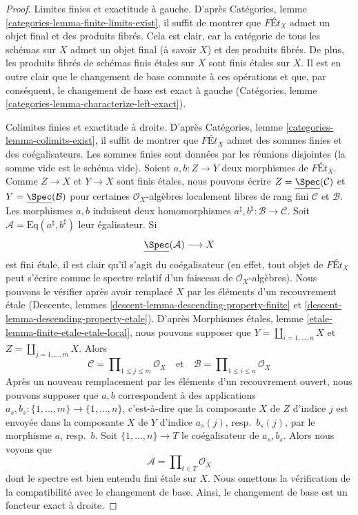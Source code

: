 \begin{proof}
Limites finies et exactitude à gauche. D'après
Catégories, lemme \ref{categories-lemma-finite-limits-exist},
il suffit de montrer que $\textit{F\'Et}_X$ admet un objet final
et des produits fibrés. Cela est clair, car la catégorie de
tous les schémas sur $X$ admet un objet final (à savoir $X$) et des produits fibrés.
De plus, les produits fibrés de schémas finis \'etales sur $X$ sont
finis \'etales sur $X$. Il est en outre clair que le changement
de base commute à ces opérations et que, par conséquent, le changement de base
est exact à gauche (Catégories, lemme
\ref{categories-lemma-characterize-left-exact}).

\medskip\noindent
Colimites finies et exactitude à droite. D'après
Catégories, lemme \ref{categories-lemma-colimits-exist},
il suffit de montrer que $\textit{F\'Et}_X$ admet des sommes
finies et des coégalisateurs. Les sommes finies sont données
par les réunions disjointes (la somme vide est le schéma vide).
Soient $a, b : Z \to Y$ deux morphismes de $\textit{F\'Et}_X$.
Comme $Z \to X$ et $Y \to X$ sont finis \'etales, nous pouvons écrire
$Z = \underline{\Spec}(\mathcal{C})$ et $Y = \underline{\Spec}(\mathcal{B})$
pour certaines $\mathcal{O}_X$-algèbres localement libres de rang fini $\mathcal{C}$
et $\mathcal{B}$. Les morphismes $a, b$ induisent deux homomorphismes
$a^\sharp, b^\sharp : \mathcal{B} \to \mathcal{C}$.
Soit $\mathcal{A} = \text{Eq}(a^\sharp, b^\sharp)$ leur
égalisateur. Si
$$
\underline{\Spec}(\mathcal{A}) \longrightarrow X
$$
est fini \'etale, il est clair qu'il s'agit du coégalisateur
(en effet, tout objet de $\textit{F\'Et}_X$ peut s'écrire
comme le spectre relatif d'un faisceau de $\mathcal{O}_X$-algèbres).
Nous pouvons le vérifier après avoir remplacé $X$ par les éléments d'un recouvrement \'etale
(Descente, lemmes \ref{descent-lemma-descending-property-finite}
et \ref{descent-lemma-descending-property-etale}).
D'après Morphismes \'etales, lemme \ref{etale-lemma-finite-etale-etale-local},
nous pouvons supposer que
$Y = \coprod_{i = 1, \ldots, n} X$ et $Z = \coprod_{j = 1, \ldots, m} X$.
Alors
$$
\mathcal{C} = \prod\nolimits_{1 \leq j \leq m} \mathcal{O}_X
\quad\text{et}\quad
\mathcal{B} = \prod\nolimits_{1 \leq i \leq n} \mathcal{O}_X
$$
Après un nouveau remplacement par les éléments d'un recouvrement ouvert,
nous pouvons supposer que $a, b$ correspondent à des
applications $a_s, b_s : \{1, \ldots, m\} \to \{1, \ldots, n\}$, c'est-à-dire que
la composante $X$ de $Z$ d'indice $j$ est envoyée dans
la composante $X$ de $Y$ d'indice $a_s(j)$, resp.\ $b_s(j)$,
par le morphisme $a$, resp.\ $b$.
Soit $\{1, \ldots, n\} \to T$ le coégalisateur de $a_s, b_s$.
Alors nous voyons que
$$
\mathcal{A} = \prod\nolimits_{t \in T} \mathcal{O}_X
$$
dont le spectre est bien entendu fini \'etale sur $X$. Nous
omettons la vérification de la compatibilité avec le changement de base.
Ainsi, le changement de base est un foncteur exact à droite.
\end{proof}

